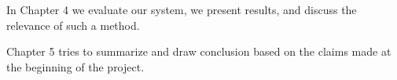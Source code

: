 In Chapter 4 we evaluate our system, we present results, and discuss the
relevance of such a method.

Chapter 5 tries to summarize and draw conclusion based on the claims made at
the beginning of the project.
